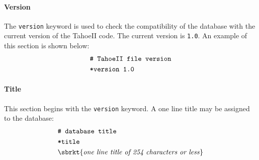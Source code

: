 \paragraph{Version}
The \texttt{version} keyword is used to check the compatibility of the 
database with the current version of the TahoeII code. 
The current version is \texttt{1.0}.
An example of 
this section is shown below:
\begin{align}
& \texttt{\# TahoeII file version} \notag \\
& \texttt{*version 1.0} \notag
\end{align}

\paragraph{Title}
This section begins with the \texttt{version} keyword.
A one line title may be assigned to the database:
\begin{align}
& \texttt{\# database title} \notag \\
& \texttt{*title} \notag \\
& \sbrkt{\textrm{\textit{one line title of 254 characters or less}}}
\end{align}
